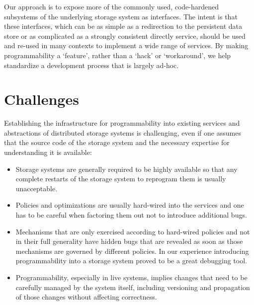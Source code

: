 \documentclass[10pt,twocolumn]{article}
\begin{document}
Our approach is to expose more of the commonly used, code-hardened subsystems
of the underlying storage system as interfaces. The intent is that these
interfaces, which can be as simple as a redirection to the persistent data
store or as complicated as a strongly consistent directly service, should be
used and re-used in many contexts to implement a wide range of services. By
making programmability a `feature', rather than a `hack' or `workaround', we
help standardize a development process that is largely ad-hoc.

%

\section{Challenges}
\label{sec:challenges}

Establishing the infrastructure for programmability into existing services and
abstractions of distributed storage systems is challenging, even if one assumes
that the source code of the storage system and the necessary expertise for
understanding it is available:

\begin{itemize}
	
\item Storage systems are generally required to be highly available so that any
complete restarts of the storage system to reprogram them is usually
unacceptable. 

\item Policies and optimizations are usually hard-wired into the services and
one has to be careful when factoring them out not to introduce additional bugs. 

\item Mechanisms that are only exercised according to hard-wired policies and
not in their full generality have hidden bugs that are revealed as soon as
those mechanisms are governed by different policies. In our experience
introducing programmability into a storage system proved to be a great
debugging tool.

\item Programmability, especially in live systems, implies changes that need to
be carefully managed by the system itself, including versioning and propagation
of those changes without affecting correctness.

\end{itemize}
\end{document}
